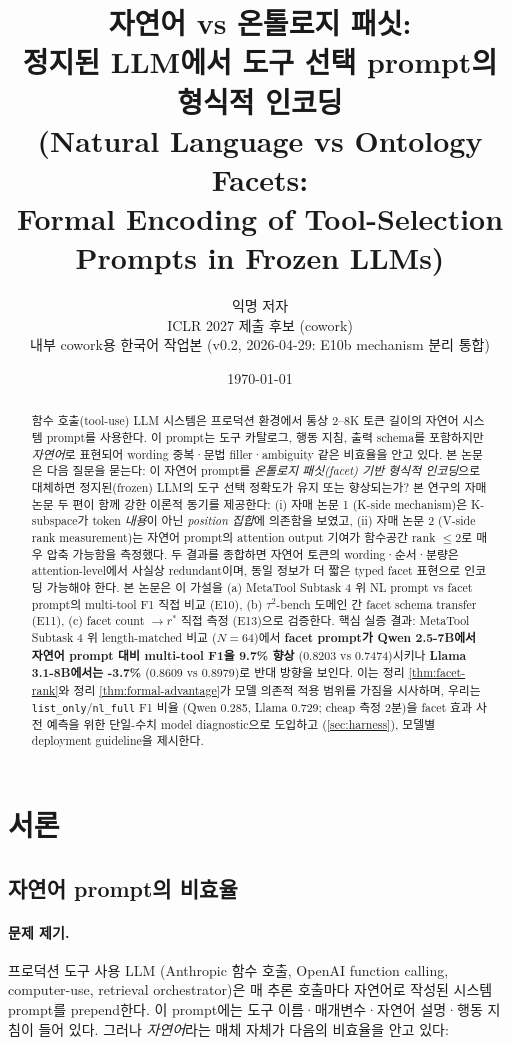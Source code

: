\documentclass[11pt]{article}
\title{
  자연어 vs 온톨로지 패싯:\\
  정지된 LLM에서 도구 선택 prompt의 형식적 인코딩\\
  \large (Natural Language vs Ontology Facets:\\
  Formal Encoding of Tool-Selection Prompts in Frozen LLMs)
}
\author{
  익명 저자\\
  ICLR 2027 제출 후보 (cowork)\\
  내부 cowork용 한국어 작업본 (v0.2, 2026-04-29: E10b mechanism 분리 통합)
}
\date{\today}
\theoremstyle{plain}
\theoremstyle{definition}
\theoremstyle{remark}
\begin{document}
\maketitle

\begin{abstract}
\noindent
함수 호출(tool-use) LLM 시스템은 프로덕션 환경에서 통상 2--8K 토큰 길이의 자연어 시스템 prompt를 사용한다. 이 prompt는 도구 카탈로그, 행동 지침, 출력 schema를 포함하지만 \emph{자연어}로 표현되어 wording 중복·문법 filler·ambiguity 같은 비효율을 안고 있다. 본 논문은 다음 질문을 묻는다: 이 자연어 prompt를 \emph{온톨로지 패싯(facet) 기반 형식적 인코딩}으로 대체하면 정지된(frozen) LLM의 도구 선택 정확도가 유지 또는 향상되는가? 본 연구의 자매 논문 두 편이 함께 강한 이론적 동기를 제공한다: (i) 자매 논문 1 (K-side mechanism)은 K-subspace가 token \emph{내용}이 아닌 \emph{position 집합}에 의존함을 보였고, (ii) 자매 논문 2 (V-side rank measurement)는 자연어 prompt의 attention output 기여가 함수공간 rank $\le 2$로 매우 압축 가능함을 측정했다. 두 결과를 종합하면 자연어 토큰의 wording·순서·분량은 attention-level에서 사실상 redundant이며, 동일 정보가 더 짧은 typed facet 표현으로 인코딩 가능해야 한다. 본 논문은 이 가설을 (a) MetaTool Subtask 4 위 NL prompt vs facet prompt의 multi-tool F1 직접 비교 (E10), (b) $\tau^2$-bench 도메인 간 facet schema transfer (E11), (c) facet count $\to r^*$ 직접 측정 (E13)으로 검증한다. 핵심 실증 결과: MetaTool Subtask 4 위 length-matched 비교 ($N{=}64$)에서 \textbf{facet prompt가 Qwen 2.5-7B에서 자연어 prompt 대비 multi-tool F1을 9.7\% 향상} (0.8203 vs 0.7474)시키나 \textbf{Llama 3.1-8B에서는 -3.7\%} (0.8609 vs 0.8979)로 반대 방향을 보인다. 이는 정리 \ref{thm:facet-rank}와 정리 \ref{thm:formal-advantage}가 모델 의존적 적용 범위를 가짐을 시사하며, 우리는 \texttt{list\_only}/\texttt{nl\_full} F1 비율 (Qwen 0.285, Llama 0.729; cheap 측정 2분)을 facet 효과 사전 예측을 위한 단일-수치 model diagnostic으로 도입하고 (\cref{sec:harness}), 모델별 deployment guideline을 제시한다.
\end{abstract}

\section{서론}
\label{sec:intro}

\subsection{자연어 prompt의 비효율}
\label{sec:nl-inefficiency}

\paragraph{문제 제기.}
프로덕션 도구 사용 LLM (Anthropic 함수 호출, OpenAI function calling, computer-use, retrieval orchestrator)은 매 추론 호출마다 자연어로 작성된 시스템 prompt를 prepend한다. 이 prompt에는 도구 이름·매개변수·자연어 설명·행동 지침이 들어 있다. 그러나 \emph{자연어}라는 매체 자체가 다음의 비효율을 안고 있다:
\end{document}
